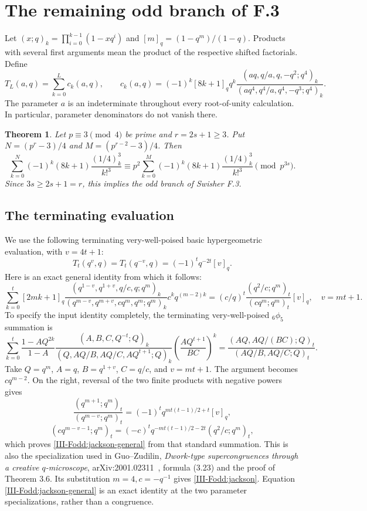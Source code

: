 \documentclass[11pt,letterpaper]{article}
\newtheorem{theorem}{Theorem}[section]
\numberwithin{equation}{section}
\begin{document}
\section{The remaining odd branch of F.3}\label{loc-III-5}\label{III-sec:F}
Let $(x;q)_k=\prod_{i=0}^{k-1}(1-xq^i)$ and
$[m]_q=(1-q^m)/(1-q)$. Products with several first arguments mean the
product of the respective shifted factorials. Define
\[
 T_L(a,q)=\sum_{k=0}^L c_k(a,q),\qquad
 c_k(a,q)=(-1)^k[8k+1]_q q^k
 \frac{(aq,q/a,q,-q^2;q^4)_k}{(aq^4,q^4/a,q^4,-q^3;q^4)_k}.
\]
The parameter $a$ is an indeterminate throughout every root-of-unity
calculation. In particular, parameter denominators do not vanish there.

\begin{theorem}\label{III-Fodd:main}
Let $p\equiv3\pmod4$ be prime and $r=2s+1\ge3$. Put
$N=(p^r-3)/4$ and $M=(p^{r-2}-3)/4$. Then
\[
 \sum_{k=0}^{N}(-1)^k(8k+1)\frac{(1/4)_k^3}{k!^3}
 \equiv p^2\sum_{k=0}^{M}(-1)^k(8k+1)\frac{(1/4)_k^3}{k!^3}
 \pmod {p^{3s}}.
\]
Since $3s\ge2s+1=r$, this implies the odd branch of Swisher F.3.
\end{theorem}

\subsection{The terminating evaluation}
We use the following terminating very-well-poised basic hypergeometric
evaluation, with $v=4t+1$:
\begin{equation}\label{III-Fodd:jackson}
 T_t(q^{v},q)=T_t(q^{-v},q)=(-1)^t q^{-2t}[v]_q.
\end{equation}
Here is an exact general identity from which it follows:
\begin{equation}\label{III-Fodd:jackson-general}
 \sum_{k=0}^{t}[2mk+1]_q
 \frac{(q^{1-v},q^{1+v},q/c,q;q^m)_k}
 {(q^{m-v},q^{m+v},cq^m,q^m;q^m)_k}
 c^k q^{(m-2)k}
 = (c/q)^t\frac{(q^2/c;q^m)_t}{(cq^m;q^m)_t}[v]_q,
 \quad v=mt+1.
\end{equation}
To specify the input identity completely, the terminating
very-well-poised ${}_6\phi_5$ summation is
\[
 \sum_{k=0}^t\frac{1-AQ^{2k}}{1-A}
 \frac{(A,B,C,Q^{-t};Q)_k}
 {(Q,AQ/B,AQ/C,AQ^{t+1};Q)_k}
 \left(\frac{AQ^{t+1}}{BC}\right)^k
 =\frac{(AQ,AQ/(BC);Q)_t}{(AQ/B,AQ/C;Q)_t}.
\]
Take $Q=q^m$, $A=q$, $B=q^{1+v}$, $C=q/c$, and $v=mt+1$.
The argument becomes $cq^{m-2}$. On the right, reversal of the
two finite products with negative powers gives
\[
 \frac{(q^{m+1};q^m)_t}{(q^{m-v};q^m)_t}
 =(-1)^tq^{mt(t-1)/2+t}[v]_q,
\]
\[
 (cq^{m-v-1};q^m)_t
 =(-c)^tq^{-mt(t-1)/2-2t}(q^2/c;q^m)_t,
\]
which proves \eqref{III-Fodd:jackson-general} from that standard summation.
This is also the specialization used in Guo--Zudilin,
\emph{Dwork-type supercongruences
through a creative $q$-microscope}, arXiv:2001.02311~\cite{III-GZ}, formula (3.23)
and the proof of Theorem 3.6. Its substitution $m=4,c=-q^{-1}$ gives
\eqref{III-Fodd:jackson}. Equation \eqref{III-Fodd:jackson-general} is an exact identity
at the two parameter specializations, rather than a congruence.
\end{document}
